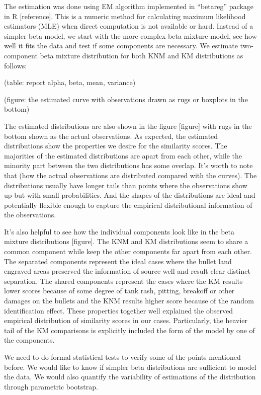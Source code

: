 \documentclass[]{elsarticle} %
\begin{document}
The estimation was done using EM algorithm implemented in ``betareg''
package in R {[}reference{]}. This is a numeric method for calculating
maximum likelihood estimators (MLE) when direct computation is not
available or hard. Instead of a simpler beta model, we start with the
more complex beta mixture model, see how well it fits the data and test
if some components are necessary. We estimate two-component beta mixture
distribution for both KNM and KM distributions as follows:

(table: report alpha, beta, mean, variance)

(figure: the estimated curve with observations drawn as rugs or boxplots
in the bottom)

The estimated distributions are also shown in the figure {[}figure{]}
with rugs in the bottom shown as the actual observations. As expected,
the estimated distributions show the properties we desire for the
similarity scores. The majorities of the estimated distributions are
apart from each other, while the minority part between the two
distributions has some overlap. It's worth to note that (how the actual
observations are distributed compared with the curves). The
distributions usually have longer tails than points where the
observations show up but with small probabilities. And the shapes of the
distributions are ideal and potentially flexible enough to capture the
empirical distributional information of the observations.

It's also helpful to see how the individual components look like in the
beta mixture distributions {[}figure{]}. The KNM and KM distributions
seem to share a common component while keep the other components far
apart from each other. The separated components represent the ideal
cases where the bullet land engraved areas preserved the information of
source well and result clear distinct separation. The shared components
represent the cases where the KM results lower scores because of some
degree of tank rash, pitting, breakoff or other damages on the bullets
and the KNM results higher score because of the random identification
effect. These properties together well explained the observed empirical
distribution of similarity scores in our cases. Particularly, the
heavier tail of the KM comparisons is explicitly included the form of
the model by one of the components.

We need to do formal statistical tests to verify some of the points
mentioned before. We would like to know if simpler beta distributions
are sufficient to model the data. We would also quantify the variability
of estimations of the distribution through parametric bootstrap.
\end{document}
